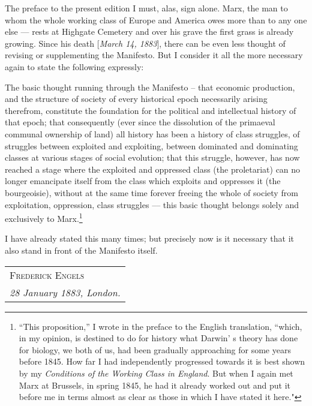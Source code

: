 The preface to the present edition I must, alas, sign alone. Marx, the man to whom the whole working class of Europe and America owes more than to any one else --- rests at Highgate Cemetery and over his grave the first grass is already growing. Since his death [\emph{March 14, 1883}], there can be even less thought of revising or supplementing the Manifesto. But I consider it all the more necessary again to state the following expressly: 

The basic thought running through the Manifesto – that economic production, and the structure of society of every historical epoch necessarily arising therefrom, constitute the foundation for the political and intellectual history of that epoch; that consequently (ever since the dissolution of the primaeval communal ownership of land) all history has been a history of class struggles, of struggles between exploited and exploiting, between dominated and dominating classes at various stages of social evolution; that this struggle, however, has now reached a stage where the exploited and oppressed class (the proletariat) can no longer emancipate itself from the class which exploits and oppresses it (the bourgeoisie), without at the same time forever freeing the whole of society from exploitation, oppression, class struggles –-- this basic thought belongs solely and exclusively to Marx.\footnote{``This proposition,'' I wrote in the preface to the English translation, ``which, in my opinion, is destined to do for history what Darwin’ s theory has done for biology, we both of us, had been gradually approaching for some years before 1845. How far I had independently progressed towards it is best shown by my \emph{Conditions of the Working Class in England}. But when I again met Marx at Brussels, in spring 1845, he had it already worked out and put it before me in terms almost as clear as those in which I have stated it here."}

I have already stated this many times; but precisely now is it necessary that it also stand in front of the Manifesto itself. 


\hfill
\begin{tabular}{@{}l@{}}
\scshape Frederick Engels \\
\emph{28 January 1883, London.}
\end{tabular}
